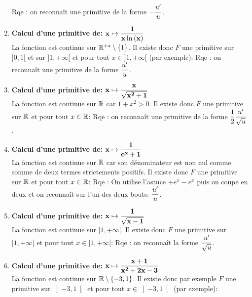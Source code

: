 \documentclass[a4paper, 11pt,reqno]{article}
\begin{document}
\begin{correction}
\begin{enumerate}
        Rqe : on reconna\^{i}t une primitive de la forme $-\displaystyle\frac{u^{\prime}}{u}$.
		\item \textbf{Calcul d'une primitive de: $\mathbf{x\mapsto \displaystyle\frac{1}{ x\ln{(x)}}}$}\\
		      \noindent  La fonction est continue sur $\mathbb{R}^{+\star}\setminus\lbrace 1\rbrace$. Il existe donc $F$ une primitive sur $\rbrack 0,1\lbrack$ et sur $\rbrack 1,+\infty\lbrack$ et pour tout $x\in\rbrack 1,+\infty\lbrack$ (par exemple):  Rqe : on reconna\^{i}t une primitive de la forme $\displaystyle\frac{u^{\prime}}{u}$.
		\item \textbf{Calcul d'une primitive de: $\mathbf{x\mapsto \displaystyle\frac{x}{\sqrt{x^2+1}}}$}\\
		      \noindent La fonction est continue sur $\mathbb{R}$ car $1+x^2>0$. Il existe donc $F$ une primitive sur $\mathbb{R}$ et pour tout $x\in\mathbb{R}$:  
        Rqe : on reconna\^{i}t une primitive de la forme $\displaystyle\frac{1}{2}\displaystyle\frac{u^{\prime}}{\sqrt{u}}$.
		\item \textbf{Calcul d'une primitive de: $\mathbf{x\mapsto \displaystyle\frac{1}{e^x+1}}$}\\
		      \noindent La fonction est continue sur $\mathbb{R}$ car son d\'enominateur est non nul comme somme de deux termes strictements positifs. Il existe donc $F$ une primitive sur $\mathbb{R}$ et pour tout $x\in\mathbb{R}$:  
        Rqe : On utilise l'astuce $+e^x-e^x$ puis on coupe en deux et on reconna\^{i}t sur l'un des deux bouts: $\displaystyle\frac{u^{\prime}}{u}$.
		\item \textbf{Calcul d'une primitive de: $\mathbf{x\mapsto \displaystyle\frac{ 1 }{ \sqrt{x-1} } }$}\\
		      \noindent La fonction est continue sur $\rbrack 1,+\infty\lbrack$. Il existe donc $F$ une primitive sur $\rbrack 1,+\infty\lbrack$ et pour tout $x\in\rbrack 1,+\infty\lbrack$:  
        Rqe : on reconna\^{i}t la forme $\displaystyle\frac{u^{\prime}}{\sqrt{u}}$.
		\item \textbf{Calcul d'une primitive de: $\mathbf{x\mapsto \displaystyle\frac{x+1}{x^2+2x-3}}$}\\
		      \noindent La fonction est continue sur $\mathbb{R}\setminus\left\lbrace -3,1\right\rbrace$. Il existe donc par exemple $F$ une primitive sur $\left\rbrack -3,1\right\lbrack$ et pour tout $x\in\left\rbrack -3,1\right\lbrack $ (par exemple):  

\end{enumerate}
\end{correction}
\end{document}
